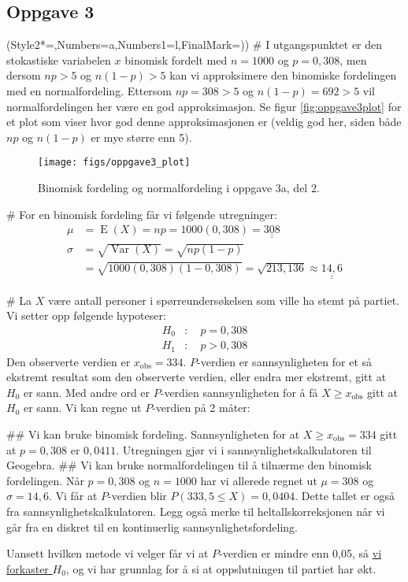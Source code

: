\documentclass[12pt, a4paper]
{article}						%
\def\answer#1{\underline{\underline{#1}}}
\newcommand{\figwidth}{0.75}
\begin{document}
\subsection*{Oppgave 3}
\begin{easylist}[enumerate]
	\ListProperties(Style2*=,Numbers=a,Numbers1=l,FinalMark={)})
	# I utgangspunktet er den stokastiske variabelen $x$ binomisk fordelt med $n = 1000$ og $p = 0,308$, men dersom $np > 5$ og $n(1-p) >5$ kan vi approksimere den binomiske fordelingen med en normalfordeling. Ettersom $np = 308 > 5 $ og $n(1-p) = 692 >5$ vil normalfordelingen her være en god approksimasjon. Se figur \eqref{fig:oppgave3plot} for et plot som viser hvor god denne approksimasjonen er (veldig god her, siden både $np$ og $n(1-p)$ er mye større enn 5).
	

	\begin{figure}[th!]
		\centering
		\texttt{[image: figs/oppgave3\_plot]}
		\caption{Binomisk fordeling og normalfordeling i oppgave 3a, del 2.}
		\label{fig:oppgave3plot}
	\end{figure}
	# For en binomisk fordeling får vi følgende utregninger:
	\begin{align*}
		\mu &= \operatorname{E}(X) = np = 1000(0,308) = \answer{308} \\
		\sigma &= \sqrt{\operatorname{Var}(X)} = \sqrt{np(1-p)} \\
		&= \sqrt{1000(0,308)(1-0,308)} = \sqrt{213,136} \approx \answer{14,6}
	\end{align*}
	
	# La $X$ være antall personer i spørreundersøkelsen som ville ha stemt på partiet.
	Vi setter opp følgende hypoteser:
	\begin{align*}
		H_0 &: \quad p = 0,308  \\
		H_1 &: \quad p > 0,308
	\end{align*}
	Den observerte verdien er $x_{\text{obs}} = 334$. $P$-verdien er sannsynligheten for et så ekstremt resultat som den observerte verdien, eller endra mer ekstremt, gitt at $H_0$ er sann. Med andre ord er $P$-verdien sannsynligheten for å få $X \geq x_{\text{obs}}$ gitt at $H_0$ er sann. Vi kan regne ut $P$-verdien på 2 måter:
	\begin{easylist}[enumerate]
	## Vi kan bruke binomisk fordeling. Sannsynligheten for at $X \geq x_{\text{obs}} = 334$ gitt at $p = 0,308$ er $0,0411$. Utregningen gjør vi i sannsynlighetskalkulatoren til Geogebra.
	## Vi kan bruke normalfordelingen til å tilnærme den binomisk fordelingen. Når $p = 0,308$ og $n=1000$ har vi allerede regnet ut $\mu = 308$ og $\sigma = 14,6$. Vi får at $P$-verdien blir $P(333,5 \leq X) = 0,0404$. Dette tallet er også fra sannsynlighetskalkulatoren. Legg også merke til heltallskorreksjonen når vi går fra en diskret til en kontinuerlig sannsynlighetsfordeling.
\end{easylist}
	Uansett hvilken metode vi velger får vi at $P$-verdien er mindre enn 0,05, så \answer{vi forkaster $H_0$}, og vi har grunnlag for å si at oppslutningen til partiet har økt.
	
\end{easylist}
\end{document}
